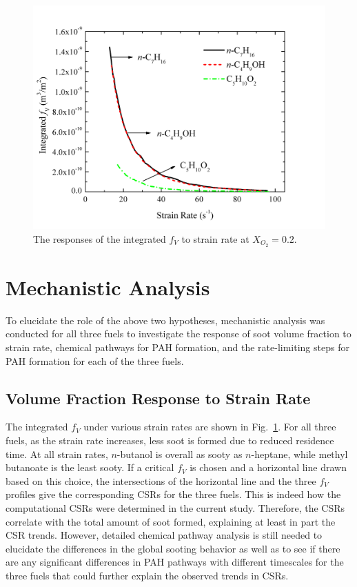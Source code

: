 \begin{figure}[t]
  \centering
  \scriptsize
  \vspace{-0.1in}
  \includegraphics[width=1.0\textwidth]{ch-biofuel/SV-SR.png}
  \normalsize
  \caption{The responses of the integrated $f_V$ to strain rate at $X_{O_2}=0.2$.}
  \label{fig:fv}
\end{figure}

\section{Mechanistic Analysis}

To elucidate the role of the above two hypotheses, mechanistic analysis was conducted for all three fuels to investigate the response of soot volume fraction to strain rate, chemical pathways for PAH formation, and the rate-limiting steps for PAH formation for each of the three fuels.

\subsection{Volume Fraction Response to Strain Rate}

The integrated $f_V$ under various strain rates are shown in Fig.~\ref{fig:fv}.  For all three fuels, as the strain rate increases, less soot is formed due to reduced residence time.  At all strain rates, $n$-butanol is overall as sooty as $n$-heptane, while methyl butanoate is the least sooty.  If a critical $f_V$ is chosen and a horizontal line drawn based on this choice, the intersections of the horizontal line and the three $f_V$ profiles give the corresponding CSRs for the three fuels.  This is indeed how the computational CSRs were determined in the current study.  Therefore, the CSRs correlate with the total amount of soot formed, explaining at least in part the CSR trends. However, detailed chemical pathway analysis is still needed to elucidate the differences in the global sooting behavior as well as to see if there are any significant differences in PAH pathways with different timescales for the three fuels that could further explain the observed trends in CSRs.

